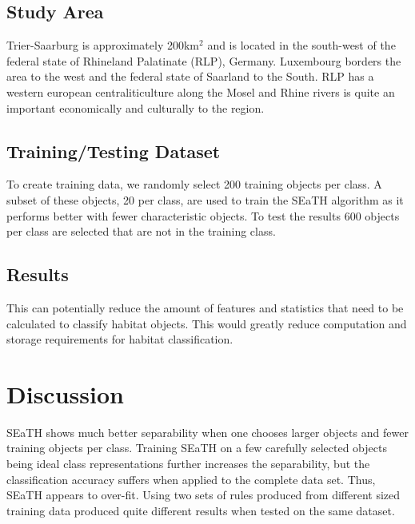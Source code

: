 \documentclass[authoryear, review,12pt,number]{elsarticle}
\begin{document}
%

\subsection{Study Area}
Trier-Saarburg is approximately 200km$^{2}$ and is located in the south-west of 
the federal state of Rhineland Palatinate (RLP), Germany. Luxembourg borders 
the area to the west and the federal state of Saarland to the South. 
RLP has a western european centraliticulture along the Mosel and Rhine rivers 
is quite an important economically and culturally to the region. 

\subsection{Training/Testing Dataset}
To create training data, we randomly select 200 training objects per class. A
subset of these objects, 20 per class, are used to train the SEaTH
algorithm as it performs better with fewer characteristic objects. To test the 
results 600 objects per class are selected that are not in the training class.

\subsection{Results}
This can potentially reduce the amount of features
and statistics that need to be calculated to classify habitat objects. This
would greatly reduce computation and storage requirements for habitat
classification.
\section{Discussion}
SEaTH shows much better separability when one chooses larger objects and fewer
training objects per class. Training SEaTH on a few carefully selected objects
being ideal class representations further increases the separability, but the classification
accuracy suffers when applied to the complete data set. Thus, SEaTH appears to
over-fit. Using two sets of rules produced from different sized training data
produced quite different results when tested on the same dataset.
\end{document}
